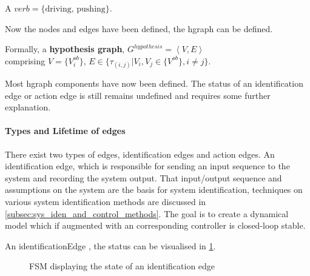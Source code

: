 A $verb = \{\textrm{driving, pushing}\}$.\bs

Now the nodes and edges have been defined, the \ac{hgraph} can be defined.\bs

Formally, a \textbf{hypothesis graph}, $G^{hypothesis} = \left\langle V, E \right\rangle $ 
\\comprising $V = \{V^{ob}_{i}\}$, \quad $E \in \{\tau_{(i,j)}| V_i, V_j \in \{V^{ob} \}, i \neq j\}$.\bs

Most \ac{hgraph} components have now been defined. The status of an identification edge or action edge is still remains undefined and requires some further explanation.\bs

\paragraph{Types and Lifetime of edges}
There exist two types of edges, identification edges and action edges. An identification edge, which is responsible for sending an input sequence to the system and recording the system output. That input/output sequence and assumptions on the system are the basis for system identification, techniques on various system identification methods are discussed in \cref{subsec:sys_iden_and_control_methods}. The goal is to create a dynamical model which if augmented with an corresponding controller is closed-loop stable.\bs

An identificationEdge , the status can be visualised in \cref{tikz:status_identification_edge}.\bs

\begin{figure}[H]
\centering
{}
\caption{\acs{FSM} displaying the state of an identification edge}%
\label{tikz:status_identification_edge}
\end{figure}

